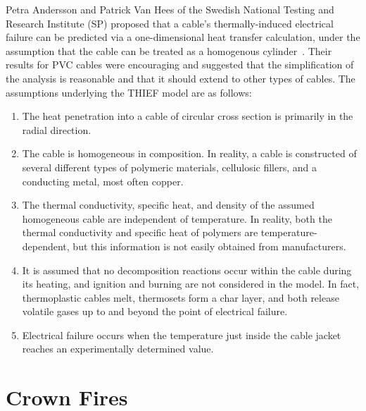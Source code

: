 Petra Andersson and Patrick Van Hees of the Swedish National Testing and Research Institute (SP) proposed that a cable's thermally-induced electrical failure can be predicted via a one-dimensional heat transfer calculation, under the assumption that the cable can be treated as a homogenous cylinder~\cite{Andersson:2005}. Their results for PVC cables were encouraging and suggested that the simplification of the analysis is reasonable and that it should extend to other types of cables. The assumptions underlying the THIEF model are as follows:
\begin{enumerate}
\item The heat penetration into a cable of circular cross section is primarily in the radial direction.
\item The cable is homogeneous in composition. In reality, a cable is constructed of several different types of polymeric materials, cellulosic fillers, and a conducting metal, most often copper.
\item The thermal conductivity, specific heat, and density of the assumed homogeneous cable are independent of temperature. In reality, both the thermal conductivity and specific heat of polymers are temperature-dependent, but this information is not easily obtained from manufacturers.
\item It is assumed that no decomposition reactions occur within the cable during its heating, and ignition and burning are not considered in the model. In fact, thermoplastic cables melt, thermosets form a char layer, and both release volatile gases up to and beyond the point of electrical failure.
\item Electrical failure occurs when the temperature just inside the cable jacket reaches an experimentally determined value.
\end{enumerate}



\section{Crown Fires}
\label{Crown_Fires_Description}


